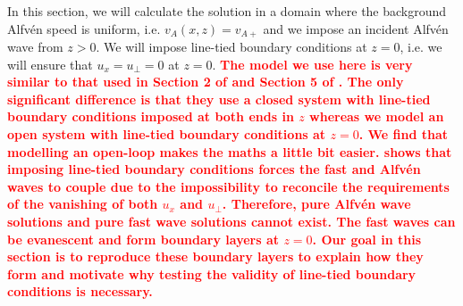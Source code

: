 \documentclass[linenumbers]{aastex63}
\newcommand{\alexedit}[1]{\textcolor{red}{\textbf{#1}}}
\begin{document}
In this section, we will calculate the solution in a domain where the background Alfv\'en speed is uniform, i.e. $v_A(x,z)=v_{A+}$ and we impose an incident Alfv\'en wave from $z>0$. We will impose line-tied boundary conditions at $z=0$, i.e. we will ensure that $u_x=u_\perp=0$ at $z=0$. \alexedit{The model we use here is very similar to that used in Section 2 of \citet{Halberstadt1993} and Section 5 of \citet{Goedbloed1994}. The only significant difference is that they use a closed system with line-tied boundary conditions imposed at both ends in $z$ whereas we model an open system with line-tied boundary conditions at $z=0$. We find that modelling an open-loop makes the maths a little bit easier. \citet{Goedbloed1994} shows that imposing line-tied boundary conditions forces the fast and Alfv\'en waves to couple due to the impossibility to reconcile the requirements of the vanishing of both $u_x$ and $u_\perp$. Therefore, pure Alfv\'en wave solutions and pure fast wave solutions cannot exist. The fast waves can be evanescent and form boundary layers at $z=0$. Our goal in this section is to reproduce these boundary layers to explain how they form and motivate why testing the validity of line-tied boundary conditions is necessary.}  
\end{document}
